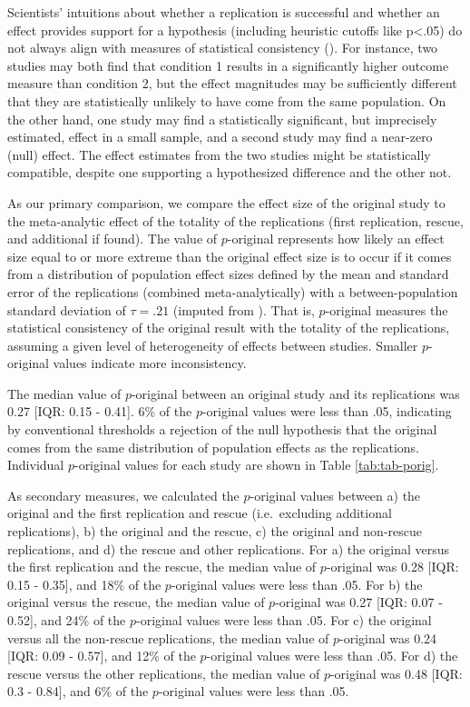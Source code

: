 \documentclass[
  english,
  a4paper,
]{article}
\begin{document}
Scientists' intuitions about whether a replication is successful and whether an effect provides support for a hypothesis (including heuristic cutoffs like p\textless.05) do not always align with measures of statistical consistency ().
For instance, two studies may both find that condition 1 results in a significantly higher outcome measure than condition 2, but the effect magnitudes may be sufficiently different that they are statistically unlikely to have come from the same population.
On the other hand, one study may find a statistically significant, but imprecisely estimated, effect in a small sample, and a second study may find a near-zero (null) effect. The effect estimates from the two studies might be statistically compatible, despite one supporting a hypothesized difference and the other not.

As our primary comparison, we compare the effect size of the original study to the meta-analytic effect of the totality of the replications (first replication, rescue, and additional if found).
The value of \(p\)-original represents how likely an effect size equal to or more extreme than the original effect size is to occur if it comes from a distribution of population effect sizes defined by the mean and standard error of the replications (combined meta-analytically) with a between-population standard deviation of \(\tau=.21\) (imputed from ).
That is, \(p\)-original measures the statistical consistency of the original result with the totality of the replications, assuming a given level of heterogeneity of effects between studies.
Smaller \(p\)-original values indicate more inconsistency.

The median value of \(p\)-original between an original study and its replications was 0.27 {[}IQR: 0.15 - 0.41{]}.
6\% of the \(p\)-original values were less than .05, indicating by conventional thresholds a rejection of the null hypothesis that the original comes from the same distribution of population effects as the replications.
Individual \(p\)-original values for each study are shown in Table \ref{tab:tab-porig}.

As secondary measures, we calculated the \(p\)-original values between a) the original and the first replication and rescue (i.e.~excluding additional replications), b) the original and the rescue, c) the original and non-rescue replications, and d) the rescue and other replications.
For a) the original versus the first replication and the rescue, the median value of \(p\)-original was 0.28 {[}IQR: 0.15 - 0.35{]}, and 18\% of the \(p\)-original values were less than .05.
For b) the original versus the rescue, the median value of \(p\)-original was 0.27 {[}IQR: 0.07 - 0.52{]}, and 24\% of the \(p\)-original values were less than .05.
For c) the original versus all the non-rescue replications, the median value of \(p\)-original was 0.24 {[}IQR: 0.09 - 0.57{]}, and 12\% of the \(p\)-original values were less than .05.
For d) the rescue versus the other replications, the median value of \(p\)-original was 0.48 {[}IQR: 0.3 - 0.84{]}, and 6\% of the \(p\)-original values were less than .05.
\end{document}
